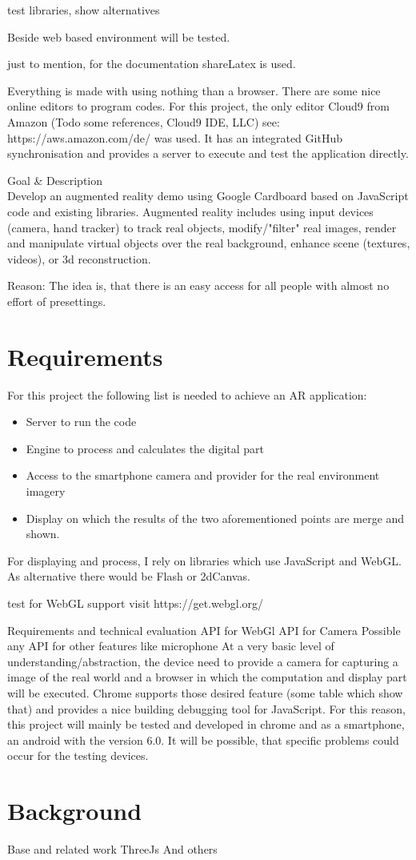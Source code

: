 test libraries, show alternatives

Beside web based environment will be tested.

just to mention, for the documentation shareLatex is used.

Everything is made with using nothing than a browser. There are some nice online editors to program codes. For this project, the only editor Cloud9 from Amazon (Todo some references, Cloud9 IDE, LLC) 
see: https://aws.amazon.com/de/
was used. It has an integrated GitHub synchronisation and provides a server to execute and test the application directly.



Goal \& Description\\
Develop an augmented reality demo using Google Cardboard based on JavaScript code and existing libraries. Augmented reality includes using input devices (camera, hand tracker) to track real objects, modify/"filter" real images, render and manipulate virtual objects over the real background, enhance scene (textures, videos), or 3d reconstruction.

Reason: The idea is, that there is an easy access for all people with almost no effort of presettings.






\section{Requirements}

For this project the following list is needed to achieve an AR application:
\begin{itemize}
    \item Server to run the code
    \item Engine to process and calculates the digital part
    \item Access to the smartphone camera and provider for the real environment imagery
    \item Display on which the results of the two aforementioned points are merge and shown.
\end{itemize}

For displaying and process, I rely on libraries which use JavaScript and WebGL. As alternative there would be Flash or 2dCanvas.

test for WebGL support visit https://get.webgl.org/



Requirements and technical evaluation
API for WebGl
API for Camera
Possible any API for other features like microphone
At a very basic level of understanding/abstraction, the device need to provide a camera for capturing a image of the real world and a browser in which the computation and display part will be executed. 
Chrome supports those desired feature (some table which show that) and provides a nice building debugging tool for JavaScript. For this reason, this project will mainly be tested and developed in chrome and as a smartphone, an android with the version 6.0. It will be possible, that specific problems could occur for the testing devices.


\section{Background}


Base and related work
ThreeJs
And others






